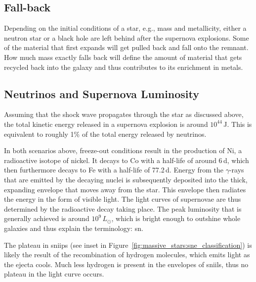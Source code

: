 \subsection{Fall-back}

Depending on the initial conditions of a star, e.g., mass and metallicity, either a neutron star or a black hole are left behind after the supernova explosions. Some of the material that first expands will get pulled back and fall onto the remnant. How much mass exactly falls back \citep[e.g.,][]{heger03} will define the amount of material that gets recycled back into the galaxy and thus contributes to its enrichment in metals.



\subsection{Neutrinos and Supernova Luminosity}

Assuming that the shock wave propagates through the star as discussed above, the total kinetic energy released in a supernova explosion is around $10^{44}$\,J. This is equivalent to roughly 1\% of the total energy released by neutrinos.

In both scenarios above, freeze-out conditions result in the production of Ni, a radioactive isotope of nickel. It decays to Co with a half-life of around 6\,d, which then furthermore decays to Fe with a half-life of 77.2\,d. Energy from the $\gamma$-rays that are emitted by the decaying nuclei is subsequently deposited into the thick, expanding envelope that moves away from the star. This envelope then radiates the energy in the form of visible light. The light curves of supernovae are thus determined by the radioactive decay taking place. The peak luminosity that is generally achieved is around $10^9\,L_\odot$, which is bright enough to outshine whole galaxies and thus explain the terminology: \acl{sn}. 

The plateau in \acp{sniip} (see inset in Figure~\ref{fig:massive_stars:sne_classification}) is likely the result of the recombination of hydrogen molecules, which emits light as the ejecta cools. Much less hydrogen is present in the envelopes of \acp{sniil}, thus no plateau in the light curve occurs.





